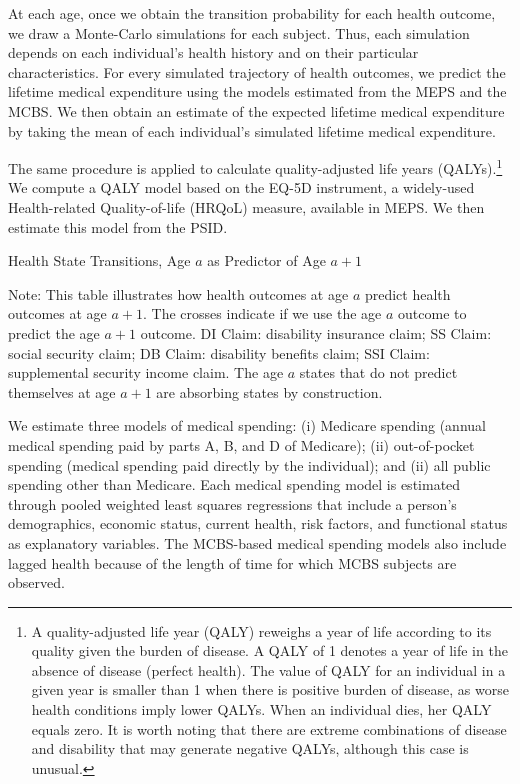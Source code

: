 At each age, once we obtain the transition probability for each health outcome, we draw a Monte-Carlo simulations for each subject. Thus, each simulation depends on each individual's health history and on their particular characteristics. For every simulated trajectory of health outcomes, we predict the lifetime medical expenditure using the models estimated from the MEPS and the MCBS. We then obtain an estimate of the expected lifetime medical expenditure by taking the mean of each individual's simulated lifetime medical expenditure. 

The same procedure is applied to calculate quality-adjusted life years (QALYs).\footnote{A quality-adjusted life year (QALY) reweighs a year of life according to its quality given the burden of disease. A QALY of 1 denotes a year of life in the absence of disease (perfect health). The value of QALY for an individual in a given year is smaller than 1 when there is positive burden of disease, as worse health conditions imply lower QALYs. When an individual dies, her QALY equals zero. It is worth noting that there are extreme combinations of disease and disability that may generate negative QALYs, although this case is unusual.} We compute a QALY model based on the EQ-5D instrument, a widely-used Health-related Quality-of-life (HRQoL) measure, available in MEPS. We then estimate this model from the PSID. 

\begin{table}
\begin{threeparttable}
\caption{Health State Transitions, Age $a$ as Predictor of Age $a+1$}\label{table:transition}
\scriptsize

\begin{tablenotes}
\footnotesize
\item Note: This table illustrates how health outcomes at age $a$ predict health outcomes at age $a+1$. The crosses indicate if we use the age $a$ outcome to predict the age $a+1$ outcome. DI Claim: disability insurance claim; SS Claim: social security claim; DB Claim: disability benefits claim; SSI Claim: supplemental security income claim. The age $a$ states that do not predict themselves at age $a+1$ are absorbing states by construction.
\end{tablenotes}
\end{threeparttable}
\end{table}

We estimate three models of medical spending: (i) Medicare spending (annual medical spending paid by parts A, B, and D of Medicare); (ii) out-of-pocket spending (medical spending paid directly by the individual); and (ii) all public spending other than Medicare. Each medical spending model is estimated through pooled weighted least squares regressions that include a person's demographics, economic status, current health, risk factors, and functional status as explanatory variables. The MCBS-based medical spending models also include lagged health because of the length of time for which MCBS subjects are observed.

